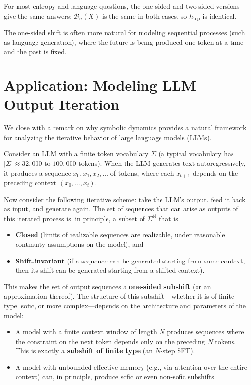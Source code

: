 For most entropy and language questions, the one-sided and two-sided versions give the same answers: $\mathcal{B}_n(X)$ is the same in both cases, so $h_{\text{top}}$ is identical.

The one-sided shift is often more natural for modeling sequential processes (such as language generation), where the future is being produced one token at a time and the past is fixed.



\section{Application: Modeling LLM Output Iteration}

We close with a remark on why symbolic dynamics provides a natural framework for analyzing the iterative behavior of large language models (LLMs).

Consider an LLM with a finite token vocabulary $\Sigma$ (a typical vocabulary has $|\Sigma| \approx 32{,}000$ to $100{,}000$ tokens). When the LLM generates text autoregressively, it produces a sequence $x_0, x_1, x_2, \ldots$ of tokens, where each $x_{t+1}$ depends on the preceding context $(x_0, \ldots, x_t)$.

Now consider the following iterative scheme: take the LLM's output, feed it back as input, and generate again. The set of sequences that can arise as outputs of this iterated process is, in principle, a subset of $\Sigma^{\mathbb{N}}$ that is:

\begin{itemize}
\item \textbf{Closed} (limits of realizable sequences are realizable, under reasonable continuity assumptions on the model), and
\item \textbf{Shift-invariant} (if a sequence can be generated starting from some context, then its shift can be generated starting from a shifted context).
\end{itemize}

This makes the set of output sequences a \textbf{one-sided subshift} (or an approximation thereof). The structure of this subshift---whether it is of finite type, sofic, or more complex---depends on the architecture and parameters of the model:

\begin{itemize}
\item A model with a finite context window of length $N$ produces sequences where the constraint on the next token depends only on the preceding $N$ tokens. This is exactly a \textbf{subshift of finite type} (an $N$-step SFT).
\item A model with unbounded effective memory (e.g., via attention over the entire context) can, in principle, produce sofic or even non-sofic subshifts.
\end{itemize}


